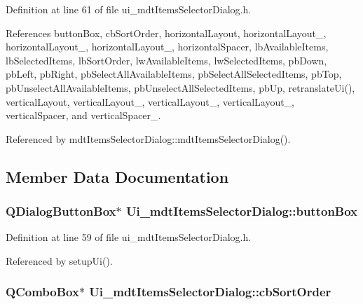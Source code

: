 Definition at line 61 of file ui\-\_\-mdt\-Items\-Selector\-Dialog.\-h.



References button\-Box, cb\-Sort\-Order, horizontal\-Layout, horizontal\-Layout\-\_, horizontal\-Layout\-\_, horizontal\-Layout\-\_, horizontal\-Spacer, lb\-Available\-Items, lb\-Selected\-Items, lb\-Sort\-Order, lw\-Available\-Items, lw\-Selected\-Items, pb\-Down, pb\-Left, pb\-Right, pb\-Select\-All\-Available\-Items, pb\-Select\-All\-Selected\-Items, pb\-Top, pb\-Unselect\-All\-Available\-Items, pb\-Unselect\-All\-Selected\-Items, pb\-Up, retranslate\-Ui(), vertical\-Layout, vertical\-Layout\-\_, vertical\-Layout\-\_, vertical\-Layout\-\_, vertical\-Spacer, and vertical\-Spacer\-\_.



Referenced by mdt\-Items\-Selector\-Dialog\-::mdt\-Items\-Selector\-Dialog().



\subsection{Member Data Documentation}
\hypertarget{class_ui__mdt_items_selector_dialog_ad107248b2f98ea1b77a5dc837cc390bb}{
\subsubsection[{button\-Box}]{\setlength{\rightskip}{0pt plus 5cm}Q\-Dialog\-Button\-Box$\ast$ Ui\-\_\-mdt\-Items\-Selector\-Dialog\-::button\-Box}}\label{class_ui__mdt_items_selector_dialog_ad107248b2f98ea1b77a5dc837cc390bb}


Definition at line 59 of file ui\-\_\-mdt\-Items\-Selector\-Dialog.\-h.



Referenced by setup\-Ui().

\hypertarget{class_ui__mdt_items_selector_dialog_a770d9ca2e922f8b7a7300f59dc742935}{
\subsubsection[{cb\-Sort\-Order}]{\setlength{\rightskip}{0pt plus 5cm}Q\-Combo\-Box$\ast$ Ui\-\_\-mdt\-Items\-Selector\-Dialog\-::cb\-Sort\-Order}}\label{class_ui__mdt_items_selector_dialog_a770d9ca2e922f8b7a7300f59dc742935}


